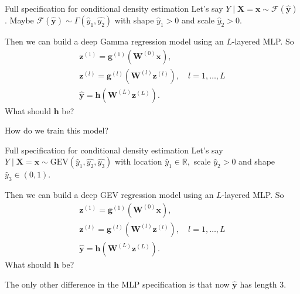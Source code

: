 \documentclass{beamer}
\begin{document}
\begin{frame}{Full specification for conditional density estimation}
Let's say $Y \mid \mathbf{X}=\mathbf{x} \sim \mathcal{F}(\hat{\mathbf{y}})$. Maybe $\mathcal{F}(\hat{\mathbf{y}})\sim\Gamma(\hat{y}_1,\hat{y_2})$ with shape $\hat{y}_1>0$ and scale $\hat{y}_2>0$. 

Then we can build a deep Gamma regression model using an $L$-layered MLP. So
$$
\begin{gathered}
\mathbf{z}^{(1)}=\mathbf{g}^{(1)}\left(\mathbf{W}^{(0)}\mathbf{x}\right), \\
\mathbf{z}^{(l)}=\mathbf{g}^{(l)}\left(\mathbf{W}^{(l)}\mathbf{z}^{(l)}\right), \quad l=1,\dots,L \\
\hat{\mathbf{y}}=\mathbf{h}\left(\mathbf{W}^{(L)}\mathbf{z}^{(L)}\right).
\end{gathered}
$$
What should $\mathbf{h}$ be? 

How do we train this model?
\end{frame}
\begin{frame}{Full specification for conditional density estimation}
Let's say $Y \mid \mathbf{X}=\mathbf{x} \sim \mbox{GEV}(\hat{y}_1,\hat{y_2}, \hat{y_3})$ with location $\hat{y}_1\in\mathbb{R},$ scale $\hat{y}_2>0$ and shape $\hat{y}_3\in(0,1)$. 

Then we can build a deep GEV regression model using an $L$-layered MLP. So
$$
\begin{gathered}
\mathbf{z}^{(1)}=\mathbf{g}^{(1)}\left(\mathbf{W}^{(0)}\mathbf{x}\right), \\
\mathbf{z}^{(l)}=\mathbf{g}^{(l)}\left(\mathbf{W}^{(l)}\mathbf{z}^{(l)}\right), \quad l=1,\dots,L \\
\hat{\mathbf{y}}=\mathbf{h}\left(\mathbf{W}^{(L)}\mathbf{z}^{(L)}\right).
\end{gathered}
$$
What should $\mathbf{h}$ be? 

The only other difference in the MLP specification is that now $\hat{\mathbf{y}}$ has length 3.

\end{frame}
\end{document}
